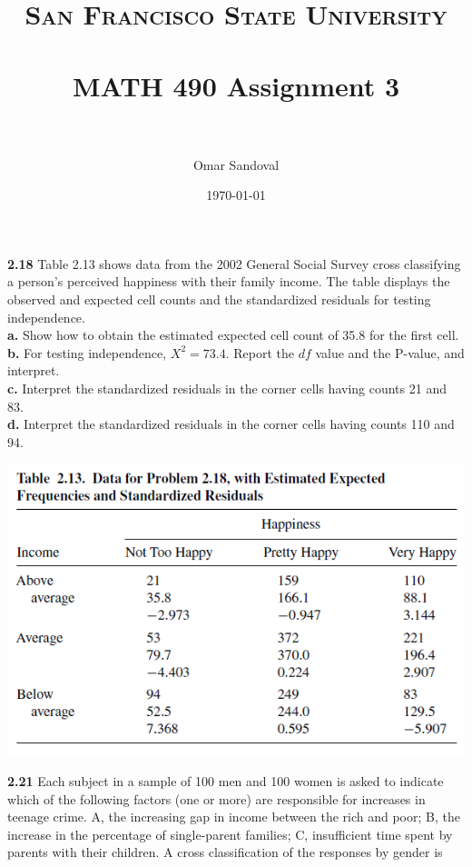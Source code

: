 \documentclass[paper=letter, fontsize=11pt]{scrartcl} %
\title{	
\normalfont \normalsize 
\textsc{San Francisco State University} \\ [25pt]
\horrule{0.5pt} \\[0.4cm] %
\huge MATH 490 Assignment 3 \\ %
\horrule{2pt} \\[0.5cm] %
}
\author{Omar Sandoval}
\date{\normalsize\today}
\begin{document}
\maketitle

\textbf{2.18}	Table 2.13 shows data from the 2002 General Social Survey cross classifying
a person's perceived happiness with their family income. The table displays the observed
and expected cell counts and the standardized residuals for testing independence. \\

\textbf{a.}	Show how to obtain the estimated expected cell count of 35.8 for the first cell.
\\

\textbf{b.} For testing independence, $X^2 = 73.4$. Report the $df$ value and the P-value, 
and interpret. \\

\textbf{c.} Interpret the standardized residuals in the corner cells having counts 21 and 
83. \\

\textbf{d.} Interpret the standardized residuals in the corner cells having counts 110 and
94. \\

\begin{center}
	\includegraphics[scale=.80]{table213.png}
\end{center}

\textbf{2.21} Each subject in a sample of 100 men and 100 women is asked to indicate which
of the following factors (one or more) are responsible for increases in teenage crime. A,
the increasing gap in income between the rich and poor; B, the increase in the percentage
of single-parent families; C, insufficient time spent by parents with their children. A 
cross classification of the responses by gender is \\
\end{document}
